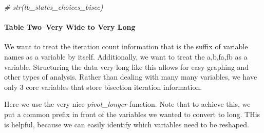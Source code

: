 \documentclass[
]{book}
\newenvironment{Shaded}{\begin{snugshade}}{\end{snugshade}}
\newcommand{\CommentTok}[1]{\textcolor[rgb]{0.56,0.35,0.01}{\textit{#1}}}
\begin{document}
\begin{Shaded}
\begin{Highlighting}[]
\CommentTok{\# str(tb\_states\_choices\_bisec)}
\end{Highlighting}
\end{Shaded}

\hypertarget{table-twovery-wide-to-very-long}{%
\paragraph{Table Two--Very Wide to Very Long}\label{table-twovery-wide-to-very-long}}

We want to treat the iteration count information that is the suffix of variable names as a variable by itself. Additionally, we want to treat the a,b,fa,fb as a variable. Structuring the data very long like this allows for easy graphing and other types of analysis. Rather than dealing with many many variables, we have only 3 core variables that store bisection iteration information.

Here we use the very nice \emph{pivot\_longer} function. Note that to achieve this, we put a common prefix in front of the variables we wanted to convert to long. THis is helpful, because we can easily identify which variables need to be reshaped.
\end{document}
